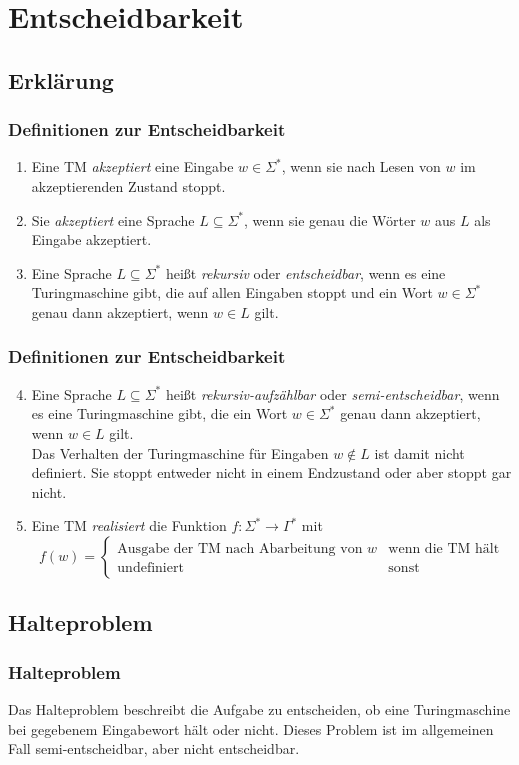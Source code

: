 \section{Entscheidbarkeit}
\subsection{Erklärung}
\begin{frame}
	\frametitle{Definitionen zur Entscheidbarkeit}
	 \begin{enumerate}
  \item Eine TM \emph{akzeptiert} eine Eingabe $w \in \Sigma^*$, wenn sie nach Lesen von $w$ im akzeptierenden Zustand stoppt.
  \item Sie \emph{akzeptiert} eine Sprache $L \subseteq \Sigma^*$, wenn sie genau die Wörter $w$ aus $L$ als Eingabe akzeptiert.
  \item Eine Sprache $L \subseteq \Sigma^*$ heißt \emph{rekursiv} oder \emph{entscheidbar}, wenn es eine Turingmaschine gibt, die auf allen Eingaben stoppt und
	ein Wort $w \in \Sigma^*$ genau dann akzeptiert, wenn $w \in L$ gilt.
\end{enumerate}
\end{frame}
\begin{frame}
	\frametitle{Definitionen zur Entscheidbarkeit}
 \begin{enumerate}
 \setcounter{enumi}{3}
  \item Eine Sprache $L \subseteq \Sigma^*$ heißt \emph{rekursiv-aufzählbar} oder \emph{semi-entscheidbar}, wenn es eine Turingmaschine gibt, die ein Wort $w \in \Sigma^*$ genau dann akzeptiert, wenn $w \in L$ gilt. \\ Das Verhalten der Turingmaschine für Eingaben $w \not\in L$ ist damit nicht definiert.
	Sie stoppt entweder nicht in einem Endzustand oder aber stoppt gar nicht.
	\item Eine TM \emph{realisiert} die Funktion $f: \Sigma^* \rightarrow \Gamma^*$ mit $$f(w) = \begin{cases} \text{Ausgabe der TM nach Abarbeitung von } w & \text{wenn die TM hält} \\ \text{undefiniert} & \text{sonst} \end{cases}$$
 \end{enumerate}
\end{frame}
\subsection{Halteproblem}
\begin{frame}
	\frametitle{Halteproblem}
	Das Halteproblem beschreibt die Aufgabe zu entscheiden, ob eine Turingmaschine bei gegebenem Eingabewort hält oder nicht. Dieses Problem ist im allgemeinen Fall semi-entscheidbar, aber nicht entscheidbar.
\end{frame}
